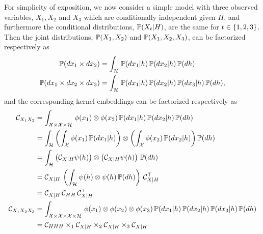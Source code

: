 \documentclass[11pt]{article}
\begin{document}
For simplicity of exposition, we now consider a simple model with three observed variables, $X_1, X_2$ and $X_3$ which are conditionally independent given $H$, and furthermore the conditional distributions, $\mathbb{P}(X_t|H)$, are the same for $t \in \left\{1,2,3\right\}$. Then the joint distributions, $\mathbb{P}(X_1,X_2)$ and $\mathbb{P}(X_1,X_2,X_3)$, can be factorized respectively as
\begin{align}
 \mathbb{P}(dx_1 \times dx_2) &= \int_{\mathcal{H}}\, \mathbb{P}(dx_1 | h )\, \mathbb{P}(d x_2 | h)\, \mathbb{P}(dh) \\
  \mathbb{P}(dx_1 \times dx_2\times dx_3) &= \int_{\mathcal{H}}\, \mathbb{P}(dx_1 | h )\, \mathbb{P}(dx_2 | h)\, \mathbb{P}(dx_3 | h)\, \mathbb{P}(dh),
\end{align}
and the corresponding kernel embeddings can be factorized respectively as
\begin{align}
  \mathcal{C}_{X_1X_2}
  &= \int_{\mathcal{X}\times \mathcal{X} \times \mathcal{H}}\, \phi(x_1) \otimes \phi(x_2)\, \mathbb{P}(dx_1 | h )\, \mathbb{P}(dx_2 | h)\, \mathbb{P}(dh) \\
  &= \int_{\mathcal{H}} \left(\int_{\mathcal{X}} \phi(x_1)\, \mathbb{P}(dx_1|h)\right) \otimes \left(\int_{\mathcal{X}} \phi(x_2)\, \mathbb{P}(dx_2 |h)\right) \mathbb{P}(dh) \\
  &= \int_{\mathcal{H}} \left(\mathcal{C}_{X|H} \psi(h)\right) \otimes \left(\mathcal{C}_{X|H} \psi(h)\right)\, \mathbb{P}(dh) \\
  &= \mathcal{C}_{X|H}\, \left(\int_{\mathcal{H}} \psi(h) \otimes \psi(h)\, \mathbb{P}(dh)\right)\, \mathcal{C}_{X|H}^\top\\
  &= \mathcal{C}_{X|H}\, \mathcal{C}_{HH}\, \mathcal{C}_{X|H}^\top \\
  \mathcal{C}_{X_1 X_2 X_3}
  &= \int_{\mathcal{X}\times \mathcal{X} \times \mathcal{X} \times \mathcal{H}}\, \phi(x_1) \otimes \phi(x_2) \otimes \phi(x_3) \, \mathbb{P}(dx_1 | h )\, \mathbb{P}(dx_2 | h)\, \mathbb{P}(dx_3 | h)\,  \mathbb{P}(dh) \\
  &= \mathcal{C}_{HHH} \times_1 \mathcal{C}_{X|H} \times_2 \mathcal{C}_{X|H} \times_3 \mathcal{C}_{X|H}
\end{align}
\end{document}
